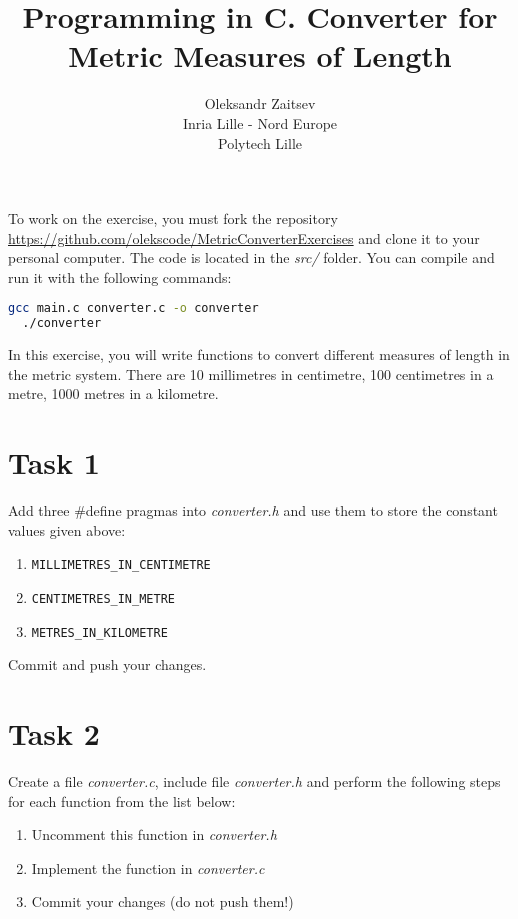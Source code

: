 \documentclass{article}
\begin{document}
\title{Programming in C. Converter for Metric Measures of Length}
\author{Oleksandr Zaitsev\\ Inria Lille - Nord Europe\\ Polytech Lille}
\date{}
\maketitle

To work on the exercise, you must fork the repository \url{https://github.com/olekscode/MetricConverterExercises} and clone it to your personal computer. The code is located in the \emph{src/} folder. You can compile and run it with the following commands:

\begin{lstlisting}[language=Bash]
  gcc main.c converter.c -o converter
  ./converter
\end{lstlisting}

In this exercise, you will write functions to convert different measures of length in the metric system. There are 10 millimetres in centimetre, 100 centimetres in a metre, 1000 metres in a kilometre.

\section*{Task 1}

Add three \#define pragmas into \emph{converter.h} and use them to store the constant values given above:

\begin{enumerate}
\item \lstinline{MILLIMETRES_IN_CENTIMETRE}
\item \lstinline{CENTIMETRES_IN_METRE}
\item \lstinline{METRES_IN_KILOMETRE}
\end{enumerate}

Commit and push your changes.

\section*{Task 2}

Create a file \emph{converter.c}, include file \emph{converter.h} and perform the following steps for each function from the list below:

\begin{enumerate}
\item Uncomment this function in \emph{converter.h}
\item Implement the function in \emph{converter.c}
\item Commit your changes (do not push them!)
\end{enumerate}
\end{document}
